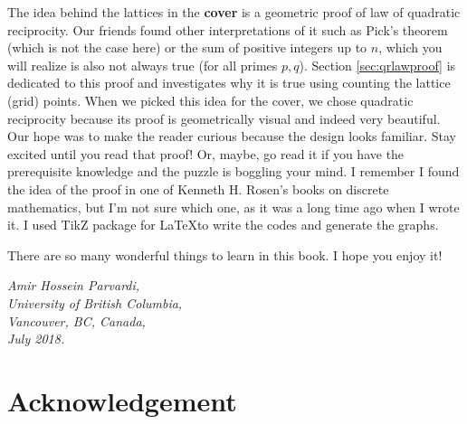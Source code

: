 \documentclass[12pt]{book}
\begin{document}
The idea behind the lattices in the \textbf{cover} is a geometric proof of law of quadratic reciprocity. Our friends found other interpretations of it such as Pick's theorem (which is not the case here) or the sum of positive integers up to $n$, which you will realize is also not always true (for all primes $p,q$). Section \eqref{sec:qrlawproof} is dedicated to this proof and investigates why it is true using counting the lattice (grid) points. When we picked this idea for the cover, we chose quadratic reciprocity because its proof is geometrically visual and indeed very beautiful. Our hope was to make the reader curious because the design looks familiar. Stay excited until you read that proof! Or, maybe, go read it if you have the prerequisite knowledge and the puzzle is boggling your mind. I remember I found the idea of the proof in one of Kenneth H. Rosen's books on discrete mathematics, but I'm not sure which one, as it was a long time ago when I wrote it. I used TikZ package for \LaTeX to write the codes and generate the graphs. 

\vspace{0.3cm}

There are so many wonderful things to learn in this book. I hope you enjoy it!
\begin{flushright}
	\sl Amir Hossein Parvardi,\\
	University of British Columbia,\\
	Vancouver, BC, Canada,\\
	July 2018.
\end{flushright}


\newpage
	
\section*{Acknowledgement}
\end{document}
